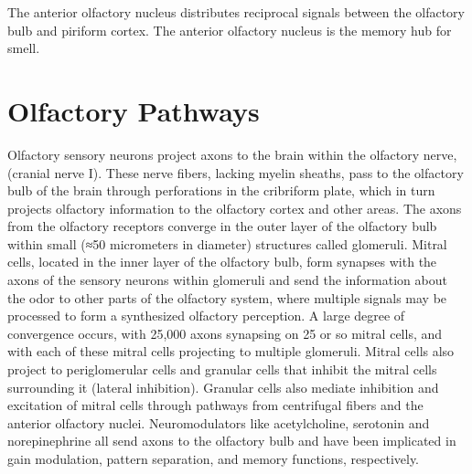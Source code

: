 The anterior olfactory nucleus distributes reciprocal signals between the olfactory bulb and piriform cortex. The anterior olfactory nucleus is the memory hub for smell.

\hypertarget{olfactory-pathways}{%
\section{Olfactory Pathways}\label{olfactory-pathways}}

Olfactory sensory neurons project axons to the brain within the olfactory nerve, (cranial nerve I). These nerve fibers, lacking myelin sheaths, pass to the olfactory bulb of the brain through perforations in the cribriform plate, which in turn projects olfactory information to the olfactory cortex and other areas. The axons from the olfactory receptors converge in the outer layer of the olfactory bulb within small (≈50 micrometers in diameter) structures called glomeruli. Mitral cells, located in the inner layer of the olfactory bulb, form synapses with the axons of the sensory neurons within glomeruli and send the information about the odor to other parts of the olfactory system, where multiple signals may be processed to form a synthesized olfactory perception. A large degree of convergence occurs, with 25,000 axons synapsing on 25 or so mitral cells, and with each of these mitral cells projecting to multiple glomeruli. Mitral cells also project to periglomerular cells and granular cells that inhibit the mitral cells surrounding it (lateral inhibition). Granular cells also mediate inhibition and excitation of mitral cells through pathways from centrifugal fibers and the anterior olfactory nuclei. Neuromodulators like acetylcholine, serotonin and norepinephrine all send axons to the olfactory bulb and have been implicated in gain modulation, pattern separation, and memory functions, respectively.

